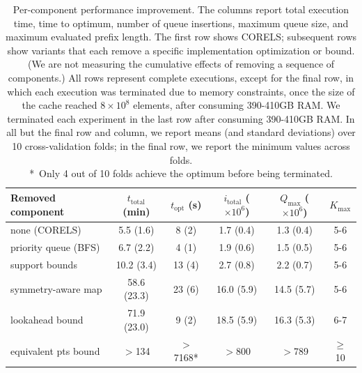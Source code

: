 \begin{arxiv}
\begin{table}[t!]
\begin{tabular}{l | c | c | c | c | c}
Removed component & $t_\text{total}$ (min) & $t_\text{opt}$ (s) & $i_\text{total}$ ($\times 10^6$) & $Q_\text{max}$ ($\times 10^6$) & $K_\text{max}$ \\
\hline
none (CORELS) & 5.5 (1.6) & 8 (2) & 1.7 (0.4) & 1.3 (0.4) & 5-6 \\
priority queue (BFS) & 6.7 (2.2) & 4 (1) & 1.9 (0.6) & 1.5 (0.5) & 5-6 \\
support bounds & 10.2 (3.4) & 13 (4) & 2.7 (0.8) & 2.2 (0.7) & 5-6 \\
symmetry-aware map & 58.6 (23.3) & 23 (6) & 16.0 (5.9) & 14.5 (5.7) & 5-6 \\
lookahead bound & 71.9 (23.0) & 9 (2) & 18.5 (5.9) & 16.3 (5.3) & 6-7 \\
equivalent pts bound & $>$134 & $>$7168* & $>$800 & $>$789 & $\ge$10
\end{tabular}
\vspace{4mm}
\caption{Per-component performance improvement.
%
The columns report total execution time,
time to optimum, number of queue insertions,
maximum queue size, and maximum evaluated prefix length.
%
The first row shows CORELS; subsequent rows show variants
that each remove a specific implementation optimization or bound.
%
(We are not measuring the cumulative effects of removing a sequence of components.)
%
All rows represent complete executions, except for the final row,
in which each execution was terminated due to memory constraints,
once the size of the cache reached ${8 \times 10^8}$ elements,
after consuming 390-410GB RAM.
We terminated each experiment in the last row after consuming 390-410GB RAM.
%
In all but the final row and column, we report means
(and standard deviations) over 10 cross-validation folds;
in the final row, we report the minimum values across folds. \\
%
*~Only 4 out of 10 folds achieve the optimum before being terminated.
}
\label{tab:ablation}
\end{table}
\end{arxiv}
